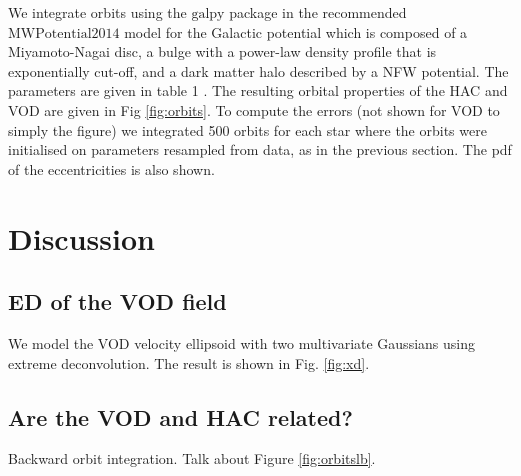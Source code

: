 \documentclass[fleqn,usenatbib]{mnras}
\begin{document}
We integrate orbits using the $\mathrm{galpy}$ package \citet{Bovy2015} in the recommended  $\mathrm{MWPotential2014}$ model for the Galactic potential which is composed of a Miyamoto-Nagai disc, a bulge with a power-law density profile that is exponentially cut-off, and a dark matter halo described by a NFW potential. The parameters are given in table 1 \citet{Bovy2015}. The resulting orbital properties of the HAC and VOD are given in Fig \ref{fig:orbits}. To compute the errors (not shown for VOD to simply the figure) we integrated 500 orbits for each star where the orbits were initialised on parameters resampled from data, as in the previous section. The pdf of the eccentricities is also shown.

\section{Discussion}
\subsection{ED of the VOD field}
We model the VOD velocity ellipsoid with two multivariate Gaussians using extreme deconvolution. The result is shown in Fig. \ref{fig:xd}.

\subsection{Are the VOD and HAC related?}
Backward orbit integration. Talk about Figure \ref{fig:orbitslb}.
\end{document}

